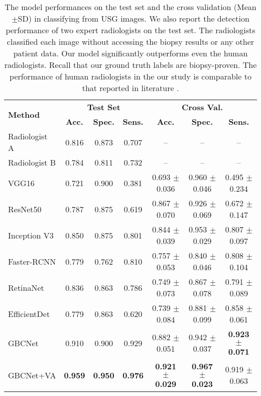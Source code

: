 \begin{table}[t]
	\centering
	\footnotesize
		\begin{tabular}{lcccccc}
			\toprule[1pt]
			\multirow{2}{*}{\textbf{Method}} & \multicolumn{3}{c}{\textbf{Test Set}} & \multicolumn{3}{c}{\textbf{Cross Val.}} \\
			\cmidrule{2-7}
			& \textbf{Acc.} & \textbf{Spec.} & \textbf{Sens.} & \textbf{Acc.} & \textbf{Spec.} & \textbf{Sens.}  \\
			\midrule[0.5pt]
			Radiologist A & 0.816 & 0.873 & 0.707 & -- & -- & --  \\
			Radiologist B & 0.784 & 0.811 & 0.732 & -- & -- & --  \\
			\midrule
			VGG16 & 0.721 & 0.900 & 0.381 & 0.693 $\pm$ 0.036 & 0.960 $\pm$ 0.046 & 0.495 $\pm$ 0.234 \\ 
			ResNet50 & 0.787 & 0.875 & 0.619 & 0.867 $\pm$ 0.070 &  0.926 $\pm$ 0.069 & 0.672 $\pm$ 0.147 \\ 
			Inception V3 & 0.850 & 0.875 & 0.801 & 0.844 $\pm$ 0.039 & 0.953 $\pm$ 0.029 & 0.807 $\pm$ 0.097 \\ %
			Faster-RCNN & 0.779 & 0.762 & 0.810 & 0.757 $\pm$ 0.053 & 0.840 $\pm$ 0.046 & 0.808 $\pm$ 0.104 \\
			RetinaNet & 0.836 & 0.863 & 0.786 & 0.749 $\pm$ 0.073 & 0.867 $\pm$ 0.078 & 0.791 $\pm$ 0.089 \\
			EfficientDet & 0.779 & 0.863 & 0.620 & 0.739 $\pm$ 0.084 & 0.881 $\pm$ 0.099 & 0.858 $\pm$ 0.061 \\
			\midrule%
			GBCNet & 0.910 & 0.900 & 0.929 & 0.882 $\pm$ 0.051 & 0.942 $\pm$ 0.037 & \textbf{0.923 $\pm$ 0.071} \\ 
			GBCNet+VA & \textbf{0.959} & \textbf{0.950} & \textbf{0.976} & \textbf{0.921 $\pm$ 0.029} & \textbf{0.967 $\pm$ 0.023} & 0.919 $\pm$ 0.063 \\
			\bottomrule[1pt]
		\end{tabular}
	\caption[Comparing GBCNet with baselines for detecting GBC from USG images]{The model performances on the test set and the cross validation (Mean$\pm$SD) in classifying \gbc from USG images. %
    We also report the \gbc detection performance of two expert radiologists on the test set. The radiologists classified each image without accessing the biopsy results or any other patient data. Our model significantly outperforms even the human radiologists. Recall that our ground truth labels are biopsy-proven. The performance of human radiologists in the our study is comparable to that reported in literature \cite{bo2019diagnostic, gupta2020evaluation}. }
	\label{tbl:perf_gbc}
\end{table}